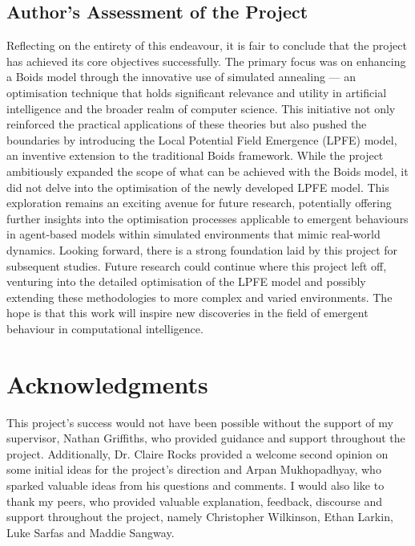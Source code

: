 \documentclass[12pt]{article}
\begin{document}
\subsection{Author's Assessment of the Project}
Reflecting on the entirety of this endeavour, it is fair to conclude that the project has achieved its core objectives successfully. The primary focus was on enhancing a Boids model through the innovative use of simulated annealing — an optimisation technique that holds significant relevance and utility in artificial intelligence and the broader realm of computer science. This initiative not only reinforced the practical applications of these theories but also pushed the boundaries by introducing the Local Potential Field Emergence (LPFE) model, an inventive extension to the traditional Boids framework. While the project ambitiously expanded the scope of what can be achieved with the Boids model, it did not delve into the optimisation of the newly developed LPFE model. This exploration remains an exciting avenue for future research, potentially offering further insights into the optimisation processes applicable to emergent behaviours in agent-based models within simulated environments that mimic real-world dynamics. Looking forward, there is a strong foundation laid by this project for subsequent studies. Future research could continue where this project left off, venturing into the detailed optimisation of the LPFE model and possibly extending these methodologies to more complex and varied environments. The hope is that this work will inspire new discoveries in the field of emergent behaviour in computational intelligence.

\newpage
\section*{Acknowledgments}
This project's success would not have been possible without the support of my supervisor, Nathan Griffiths, who provided guidance and support throughout the project. Additionally, Dr. Claire Rocks provided a welcome second opinion on some initial ideas for the project's direction and Arpan Mukhopadhyay, who sparked valuable ideas from his questions and comments. I would also like to thank my peers, who provided valuable explanation, feedback, discourse and support throughout the project, namely Christopher Wilkinson, Ethan Larkin, Luke Sarfas and Maddie Sangway.

\newpage

 
\end{document}
